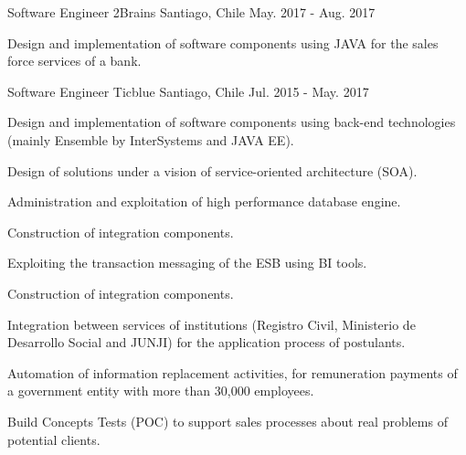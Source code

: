 \begin{cventries}
  \cventry
    {Software Engineer} %
    {2Brains} %
    {Santiago, Chile} %
    {May. 2017 - Aug. 2017} %
    {
      \begin{cvitems} %
        \item {Design and implementation of software components using JAVA for the sales force services of a bank.}
      \end{cvitems}
    }

  \cventry
    {Software Engineer} %
    {Ticblue} %
    {Santiago, Chile} %
    {Jul. 2015 - May. 2017} %
    {
      \begin{cvitems} %
        \item {Design and implementation of software components using back-end technologies (mainly Ensemble by InterSystems and JAVA EE).}
        \item {Design of solutions under a vision of service-oriented architecture (SOA).}
        \item {Administration and exploitation of high performance database engine.}
        \item {Construction of integration components.}
        \item {Exploiting the transaction messaging of the ESB using BI tools.}
        \item {Construction of integration components.}
        \item {Integration between services of institutions (Registro Civil, Ministerio de Desarrollo Social and JUNJI) for the application process of postulants.}
        \item {Automation of information replacement activities, for remuneration payments of a government entity with more than 30,000 employees.}
        \item {Build Concepts Tests (POC) to support sales processes about real problems of potential clients.}
      \end{cvitems}
    }

\end{cventries}
